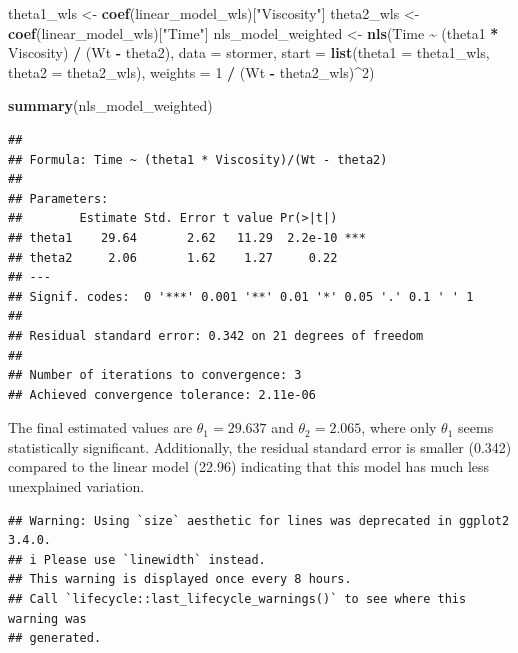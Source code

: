 \documentclass[
  11pt,
]{article}
\newenvironment{Shaded}{\begin{snugshade}}{\end{snugshade}}
\newcommand{\AttributeTok}[1]{\textcolor[rgb]{0.13,0.29,0.53}{#1}}
\newcommand{\DecValTok}[1]{\textcolor[rgb]{0.00,0.00,0.81}{#1}}
\newcommand{\FunctionTok}[1]{\textcolor[rgb]{0.13,0.29,0.53}{\textbf{#1}}}
\newcommand{\NormalTok}[1]{#1}
\newcommand{\OtherTok}[1]{\textcolor[rgb]{0.56,0.35,0.01}{#1}}
\newcommand{\SpecialCharTok}[1]{\textcolor[rgb]{0.81,0.36,0.00}{\textbf{#1}}}
\newcommand{\StringTok}[1]{\textcolor[rgb]{0.31,0.60,0.02}{#1}}
\begin{document}
\begin{Shaded}
\begin{Highlighting}[]
\NormalTok{theta1\_wls }\OtherTok{\textless{}{-}} \FunctionTok{coef}\NormalTok{(linear\_model\_wls)[}\StringTok{"Viscosity"}\NormalTok{]}
\NormalTok{theta2\_wls }\OtherTok{\textless{}{-}} \FunctionTok{coef}\NormalTok{(linear\_model\_wls)[}\StringTok{"Time"}\NormalTok{]}
\NormalTok{nls\_model\_weighted }\OtherTok{\textless{}{-}} \FunctionTok{nls}\NormalTok{(Time }\SpecialCharTok{\textasciitilde{}}\NormalTok{ (theta1 }\SpecialCharTok{*}\NormalTok{ Viscosity) }\SpecialCharTok{/}\NormalTok{ (Wt }\SpecialCharTok{{-}}\NormalTok{ theta2), }
                          \AttributeTok{data =}\NormalTok{ stormer,}
                          \AttributeTok{start =} \FunctionTok{list}\NormalTok{(}\AttributeTok{theta1 =}\NormalTok{ theta1\_wls, }\AttributeTok{theta2 =}\NormalTok{ theta2\_wls),}
                          \AttributeTok{weights =} \DecValTok{1} \SpecialCharTok{/}\NormalTok{ (Wt }\SpecialCharTok{{-}}\NormalTok{ theta2\_wls)}\SpecialCharTok{\^{}}\DecValTok{2}\NormalTok{)}

\FunctionTok{summary}\NormalTok{(nls\_model\_weighted)}
\end{Highlighting}
\end{Shaded}

\begin{verbatim}
## 
## Formula: Time ~ (theta1 * Viscosity)/(Wt - theta2)
## 
## Parameters:
##        Estimate Std. Error t value Pr(>|t|)    
## theta1    29.64       2.62   11.29  2.2e-10 ***
## theta2     2.06       1.62    1.27     0.22    
## ---
## Signif. codes:  0 '***' 0.001 '**' 0.01 '*' 0.05 '.' 0.1 ' ' 1
## 
## Residual standard error: 0.342 on 21 degrees of freedom
## 
## Number of iterations to convergence: 3 
## Achieved convergence tolerance: 2.11e-06
\end{verbatim}

The final estimated values are \(\theta_1 = 29.637\) and
\(\theta_2 = 2.065\), where only \(\theta_1\) seems statistically
significant. Additionally, the residual standard error is smaller
(0.342) compared to the linear model (22.96) indicating that this model
has much less unexplained variation.

\begin{verbatim}
## Warning: Using `size` aesthetic for lines was deprecated in ggplot2 3.4.0.
## i Please use `linewidth` instead.
## This warning is displayed once every 8 hours.
## Call `lifecycle::last_lifecycle_warnings()` to see where this warning was
## generated.
\end{verbatim}
\end{document}
